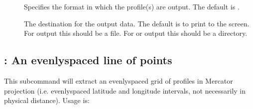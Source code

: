 \documentclass[letterpaper,10pt,english]{sphinxmanual}
\begin{document}
\sphinxAtStartPar
{}
\begin{description}
\item[{}] \leavevmode
\sphinxAtStartPar
Specifies the format in which the profile(s) are output.  The default is .

\item[{}] \leavevmode
\sphinxAtStartPar
The destination for the output data.  The default is to print to the screen.  For  output this should be a file.  For  or  output this should be a directory.

\item[{}] \leavevmode
\sphinxAtStartPar
{}

\sphinxAtStartPar
{}

\end{description}


\subsection{: An evenly\sphinxhyphen{}spaced line of points}
\label{\detokenize{userguide:id1}}
\sphinxAtStartPar
This subcommand will extract an evenly\sphinxhyphen{}spaced grid of profiles in Mercator projection (i.e. evenly\sphinxhyphen{}spaced latitude and longitude intervals, not necessarily in physical distance).  Usage is:
\end{document}
